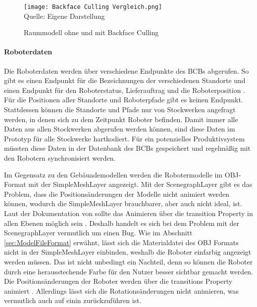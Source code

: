 \begin{figure}[H]
    \caption{Raummodell ohne und mit Backface Culling}\label{fig:BackfaceCulling}
    \texttt{[image: Backface Culling Vergleich.png]}
    \\
    Quelle: Eigene Darstellung
\end{figure}

\paragraph{Roboterdaten}\label{sec:RobotData}
Die Roboterdaten werden über verschiedene Endpunkte des \ac{BCB}s abgerufen. So gibt es einen Endpunkt für die Bezeichnungen der verschiedenen Standorte und einen Endpunkt für den Roboterstatus, Lieferauftrag und die Roboterposition \cite{BCBSwagger}. Für die Positionen aller Standorte und Roboterpfade gibt es keinen Endpunkt. Stattdessen können die Standorte und Pfade nur von Stockwerken angefragt werden, in denen sich zu dem Zeitpunkt Roboter befinden. Damit immer alle Daten aus allen Stockwerken abgerufen werden können, sind diese Daten im Prototyp für alle Stockwerke hartkodiert. Für ein potenzielles Produktivsystem müssten diese Daten in der Datenbank des \ac{BCB}s gespeichert und regelmäßig mit den Robotern synchronisiert werden.

Im Gegensatz zu den Gebäuademodellen werden die Robotermodelle im \ac{OBJ}-Format mit der SimpleMeshLayer \cite{DeckglSimpleMeshLayer} angezeigt. Mit der ScenegraphLayer gibt es das Problem, dass die Positionsänderungen der Modelle nicht animiert werden können, wodurch die SimpleMeshLayer brauchbarer, aber auch nicht ideal, ist. Laut der Dokumentation von \deckgl{} sollte das Animieren über die transition Property in allen Ebenen möglich sein \cite{DeckglLayerClass}. Deshalb handelt es sich bei dem Problem mit der ScenegraphLayer vermutlich um einen Bug. Wie im Abschnitt \ref{sec:ModelFileFormat} erwähnt, lässt sich die Materialdatei des \ac{OBJ} Formats nicht in der SimpleMeshLayer einbinden, weshalb die Roboter einfarbig angezeigt werden müssen. Das ist nicht unbedingt ein Nachteil, denn so können die Roboter durch eine herausstechende Farbe für den Nutzer besser sichtbar gemacht werden. Die Positionsänderungen der Roboter werden über die transitions Property animiert \cite{DeckglLayerClass}. Allerdings lässt sich die Rotationsänderungen nicht animieren, was vermutlich auch auf einin \deckgl{} zurückzuführen ist.

